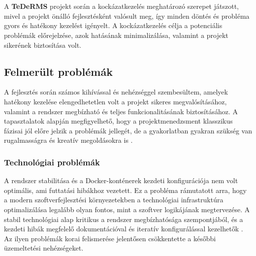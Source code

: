 \chapter{\riskproblem}

A \textbf{TeDeRMS} projekt során a kockázatkezelés meghatározó szerepet játszott, 
mivel a projekt önálló fejlesztésként valósult meg, így minden döntés és probléma gyors és hatékony kezelést igényelt. 
A kockázatkezelés célja a potenciális problémák előrejelzése, azok hatásának minimalizálása, 
valamint a projekt sikerének biztosítása volt.

\section{Felmerült problémák}

A fejlesztés során számos kihívással és nehézséggel szembesültem, amelyek hatékony kezelése elengedhetetlen volt a projekt sikeres megvalósításához, 
valamint a rendszer megbízható és teljes funkcionalitásának biztosításához.
A tapasztalatok alapján megfigyelhető, hogy a projektmenedzsment klasszikus fázisai jól előre jelzik a 
problémák jellegét, de a gyakorlatban gyakran szükség van rugalmasságra és kreatív megoldásokra is \cite{Hajdu2014,Szalay2018}.

\subsection{Technológiai problémák}
A rendszer stabilitása és a Docker-konténerek kezdeti konfigurációja nem volt optimális, ami futtatási hibákhoz vezetett.
Ez a probléma rámutatott arra, hogy a modern szoftverfejlesztési környezetekben a technológiai infrastruktúra 
optimalizálása legalább olyan fontos, mint a szoftver logikájának megtervezése. 
A stabil technológiai alap kritikus a rendszer megbízhatósága szempontjából, 
és a kezdeti hibák megfelelő dokumentációval és iteratív konfigurálással kezelhetők \cite{Kovacs2016,Kaposi2019}. 
Az ilyen problémák korai felismerése jelentősen csökkentette a későbbi üzemeltetési nehézségeket.

